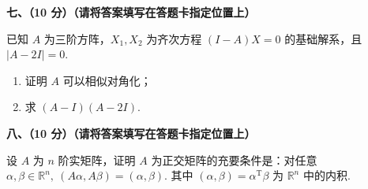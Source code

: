 \documentclass[a4paper,11pt]{ctexart}
\newcommand{\T}{\mathrm{T}}
\begin{document}
\vspace{0.8em}

\textbf{七、（10 分）（请将答案填写在答题卡指定位置上）}

已知 $A$ 为三阶方阵，$X_1, X_2$ 为齐次方程 $(I - A)X = 0$ 的基础解系，且 $|A - 2I| = 0$.
\begin{enumerate}[label=(\arabic*), leftmargin=2.4em, itemsep=0.25em, topsep=0.3em]
  \item 证明 $A$ 可以相似对角化；
  \item 求 $(A - I)(A - 2I)$.
\end{enumerate}

\vspace{0.8em}

\textbf{八、（10 分）（请将答案填写在答题卡指定位置上）}

设 $A$ 为 $n$ 阶实矩阵，证明 $A$ 为正交矩阵的充要条件是：对任意 $\alpha, \beta \in \mathbb{R}^n,\ (A\alpha, A\beta) = (\alpha, \beta)$. 其中 $(\alpha, \beta) = \alpha^{\T}\beta$ 为 $\mathbb{R}^n$ 中的内积.
\end{document}
